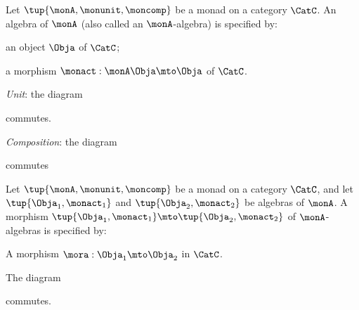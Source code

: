 \begin{ctdefinition}
Let $\tup{\monA, \monunit, \moncomp}$ be a monad on a category $\CatC$. An algebra of $\monA$ (also called an $\monA$-algebra) is specified by:

\constit
\begin{compactenum}
\item an object $\Obja$ of $\CatC$;
\item a morphism $\monact: \monA \Obja \mto \Obja$ of $\CatC$. 
\end{compactenum}
\condit
\begin{compactenum}
\item \emph{Unit}: the diagram 
\begin{center}
  \end{center}
commutes.
\item \emph{Composition}: the diagram
\begin{center}
  \end{center}
commutes
\end{compactenum}

\end{ctdefinition}


\begin{ctdefinition}
Let $\tup{\monA, \monunit, \moncomp}$ be a monad on a category $\CatC$, and let $\tup{\Obja_1, \monact_1}$ and $\tup{\Obja_2, \monact_2}$ be algebras of $\monA$. A morphism $\tup{\Obja_1, \monact_1} \mto \tup{\Obja_2, \monact_2}$ of $\monA$-algebras is specified by:

\constit
\begin{compactenum}
\item A morphism $\mora : \Obja_1 \mto \Obja_2$ in $\CatC$.
\end{compactenum}
\condit
\begin{compactenum}
\item The diagram
\begin{center}
  \end{center}
commutes. 
\end{compactenum}
\end{ctdefinition}


